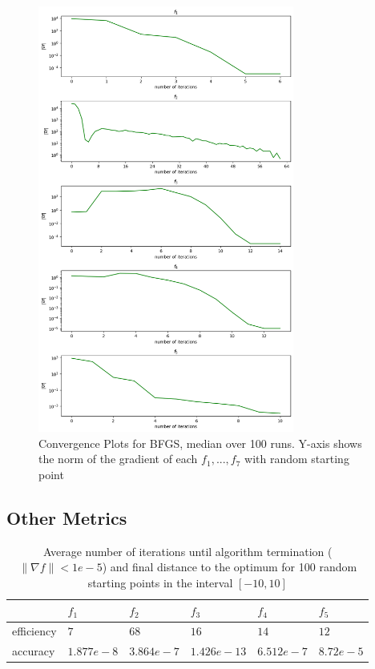 \documentclass[a4paper]{article}
\begin{document}
\begin{figure}[H]
  \centering
  \includegraphics[width=0.75\textwidth]{plt_grad_norms.png}
  \caption{Convergence Plots for BFGS, median over 100 runs. Y-axis shows the
    norm of the gradient of each $f_1,...,f_7$ with random starting point}
  \label{plt2}
\end{figure}

\subsection{Other Metrics}
\label{subsec:label}
\begin{table}[H]
\centering
\begin{tabular}{|l|l|l|l|l|l|}
\hline
                 & $f_1$ & $f_2$   & $f_3$  & $f_4$  & $f_5$ \\ \hline
efficiency & $7$ & $68$ & $16$ & $14$ & $12$ \\ \hline
accuracy & $1.877e-8$  & $3.864e-7$ & $1.426e-13$  & $6.512e-7$  & $8.72e-5$ \\ \hline
\end{tabular}
\caption{Average number of iterations until algorithm termination ( $\| \nabla f \| < 1e-5$) and final distance to the optimum for 100 random starting points in the interval $[-10,10]$}
\label{table}
\end{table}
\end{document}
